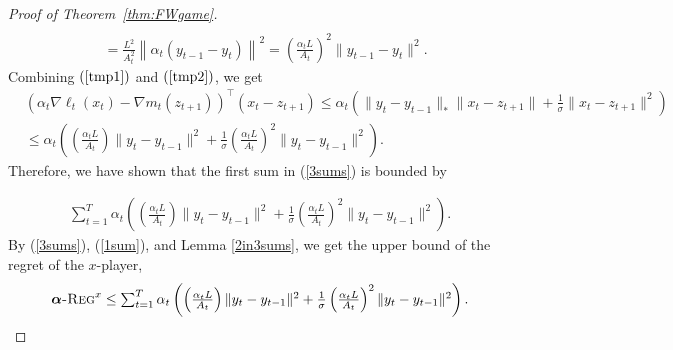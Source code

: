 \documentclass[final,12pt]{colt2018} %
\def\balpha{\boldsymbol{\alpha}}
\newcommand{\regret}[1]{\balpha\textsc{-Reg}^{#1}}
\newcommand{\pr}[1]{\left(#1\right)}
\begin{document}
\begin{proof}[Proof of Theorem~\ref{thm:FWgame}]
\begin{equation*}
\begin{aligned}
	\end{aligned}
	\end{equation*}\vspace{-8mm}
	\begin{align}
	&= \textstyle \frac{L^2}{A_t^2} \left\|  \alpha_t ( y_{t-1} - y_t ) \right\|^2
	= \pr{\frac{\alpha_t L }{A_t}}^2 \|y_{t-1} - y_t \|^2. \label{tmp2}
	\end{align}	
	Combining $(\ref{tmp1})$ and $(\ref{tmp2})$, we get
	\begin{equation}
	\begin{aligned}
	& ( \alpha_t \nabla \ell_t(x_t) - \nabla m_t(z_{t+1})  )^\top (x_t - z_{t+1})
	\leq \alpha_t  ( \| y_t - y_{t-1} \|_* \| x_t- z_{t+1} \| + \frac{1}{\sigma} \| x_t - z_{t+1} \|^2 ) 
	\\ & \textstyle\leq \alpha_t  \pr{\pr{\frac{\alpha_t L }{A_t}}  \| y_t - y_{t-1} \|^2 + \frac{1}{\sigma} \pr{\frac{\alpha_t L}{A_t}}^2  \| y_t - y_{t-1} \|^2 }.
	\end{aligned}
	\end{equation}
	Therefore, we have shown that the first sum in (\ref{3sums}) is bounded by

\begin{comment}
\begin{equation} \label{1sum}
\begin{aligned}
&\textstyle
\sum_{t=1}^T( \alpha_t \nabla \ell_t(x_t) - \nabla m_t(z_{t+1})  )^\top (x_t - z_{t+1})
\leq 	\sum_{t=1}^T
\alpha_t \big( \frac{\alpha_t L}{A_t} \| y_t - y_{t-1} \|^2 
 + \frac{1}{\sigma} (\frac{\alpha_t L }{A_t})^2 \big) \| y_t - y_{t-1} \|^2.
\end{aligned}
\end{equation}
\end{comment}

	\begin{equation} \label{1sum}
	\begin{aligned}
	\textstyle
	\sum_{t=1}^T
	\alpha_t  \pr{ \pr{\frac{\alpha_t L}{A_t}}  \| y_t - y_{t-1} \|^2 	+  \frac{1}{\sigma} \pr{\frac{\alpha_t L }{A_t}}^2  \| y_t - y_{t-1} \|^2 }.
	\end{aligned}
	\end{equation}
	By (\ref{3sums}), (\ref{1sum}), and Lemma \ref{2in3sums}, we get the upper bound of the regret of the $x$-player,
	\begin{equation} \label{regret_x}
\textstyle	\regret{x} \leq \sum_{t=1}^T
	\alpha_t  \pr{\pr{\frac{\alpha_t L}{A_t}}  \| y_t - y_{t-1} \|^2 + \frac{1}{\sigma} \pr{\frac{\alpha_t L }{A_t}}^2  \| y_t - y_{t-1} \|^2 }.
	\end{equation}
	

\end{proof}
\end{document}
